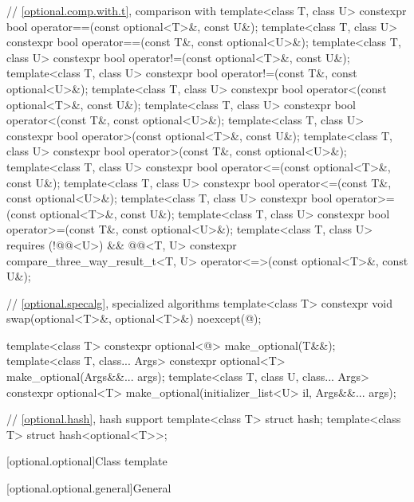 \begin{codeblock}
{  // \ref{optional.comp.with.t}, comparison with 
  template<class T, class U> constexpr bool operator==(const optional<T>&, const U&);
  template<class T, class U> constexpr bool operator==(const T&, const optional<U>&);
  template<class T, class U> constexpr bool operator!=(const optional<T>&, const U&);
  template<class T, class U> constexpr bool operator!=(const T&, const optional<U>&);
  template<class T, class U> constexpr bool operator<(const optional<T>&, const U&);
  template<class T, class U> constexpr bool operator<(const T&, const optional<U>&);
  template<class T, class U> constexpr bool operator>(const optional<T>&, const U&);
  template<class T, class U> constexpr bool operator>(const T&, const optional<U>&);
  template<class T, class U> constexpr bool operator<=(const optional<T>&, const U&);
  template<class T, class U> constexpr bool operator<=(const T&, const optional<U>&);
  template<class T, class U> constexpr bool operator>=(const optional<T>&, const U&);
  template<class T, class U> constexpr bool operator>=(const T&, const optional<U>&);
  template<class T, class U> requires (!@@<U>) && @@<T, U>
    constexpr compare_three_way_result_t<T, U>
      operator<=>(const optional<T>&, const U&);

  // \ref{optional.specalg}, specialized algorithms
  template<class T>
    constexpr void swap(optional<T>&, optional<T>&) noexcept(@\seebelow@);

  template<class T>
    constexpr optional<@\seebelow@> make_optional(T&&);
  template<class T, class... Args>
    constexpr optional<T> make_optional(Args&&... args);
  template<class T, class U, class... Args>
    constexpr optional<T> make_optional(initializer_list<U> il, Args&&... args);

  // \ref{optional.hash}, hash support
  template<class T> struct hash;
  template<class T> struct hash<optional<T>>;
}
\end{codeblock}

[optional.optional]{Class template }

[optional.optional.general]{General}

